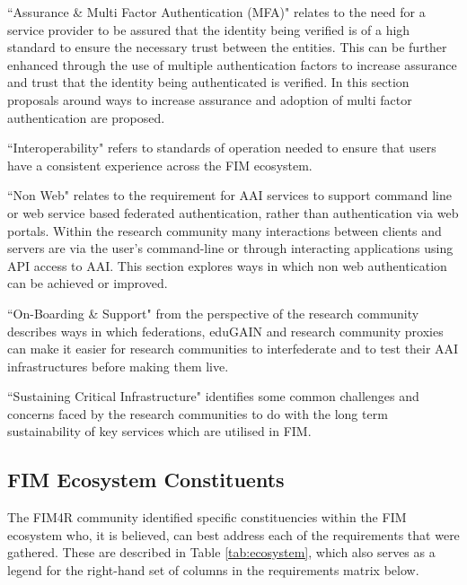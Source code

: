 \documentclass[fleqn,10pt]{wlscirep}
\begin{document}
{``Assurance \& Multi Factor Authentication (MFA)" relates to the need for a service provider to be assured that the identity being verified is of a high standard to ensure the necessary trust between the entities.  This can be further enhanced through the use of multiple authentication factors to increase assurance and trust that the identity being authenticated is verified.  In this section proposals around ways to increase assurance and adoption of multi factor authentication are proposed. 

``Interoperability" refers to standards of operation needed to ensure that users have a consistent experience across the FIM ecosystem. 

``Non Web" relates to the requirement for AAI services to support command line or web service based federated authentication, rather than authentication via web portals.  Within the research community many interactions between clients and servers are via the user's command-line or through interacting applications using API access to AAI.  This section explores ways in which non web authentication can be achieved or improved.  

``On-Boarding \& Support" from the perspective of the research community describes ways in which federations, eduGAIN and research community proxies can make it easier for research communities to interfederate and to test their AAI infrastructures before making them live.

``Sustaining Critical Infrastructure" identifies some common challenges and concerns faced by the research communities to do with the long term sustainability of key services which are utilised in FIM. 

\subsection{FIM Ecosystem Constituents}
The FIM4R community identified specific constituencies within the FIM ecosystem who, it is believed, can best address each of the requirements that were gathered. These are described in Table \ref{tab:ecosystem}, which also serves as a legend for the right-hand set of columns in the requirements matrix below.

}
\end{document}
